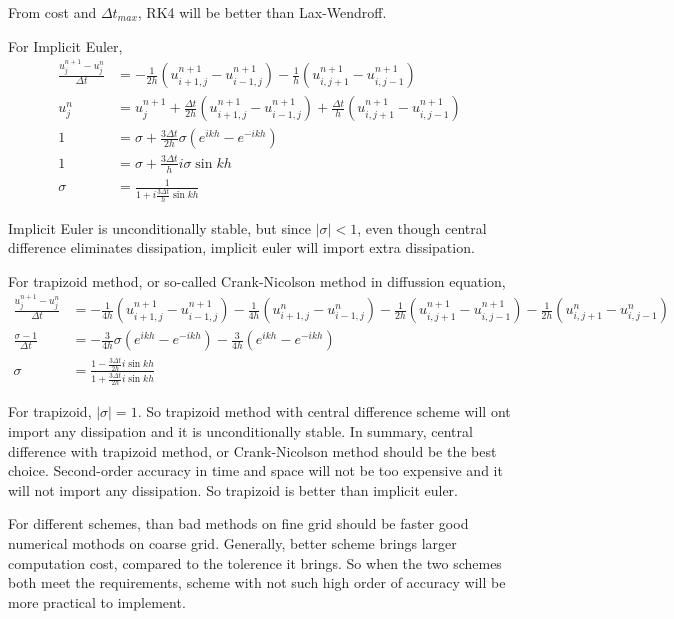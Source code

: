 \documentclass[letterpaper,10pt]{article}
\begin{document}
From cost and $\Delta t_{max}$, RK4 will be better than Lax-Wendroff. 

For Implicit Euler, 
\begin{align*}
  \frac{u_j^{n+1}-u_j^n}{\Delta t}&=-\frac{1}{2h}\left(u^{n+1}_{i+1,j}-u^{n+1}_{i-1,j}\right)-\frac{1}{h}\left(u^{n+1}_{i,j+1}-u^{n+1}_{i,j-1}\right)\\
  u_j^n&=u_j^{n+1}+\frac{\Delta t}{2h}\left(u^{n+1}_{i+1,j}-u^{n+1}_{i-1,j}\right)+\frac{\Delta t}{h}\left(u^{n+1}_{i,j+1}-u^{n+1}_{i,j-1}\right)\\
  1&=\sigma+\frac{3\Delta t}{2h}\sigma\left(e^{ikh}-e^{-ikh}\right)\\
  1&=\sigma+\frac{3\Delta t}{h}i\sigma\sin kh\\
  \sigma&=\frac{1}{1+i\frac{3\Delta t}{h}\sin kh}
\end{align*}

Implicit Euler is unconditionally stable, but since $|\sigma|<1$, even though central difference eliminates dissipation, implicit euler will import 
extra dissipation. 

For trapizoid method, or so-called Crank-Nicolson method in diffussion equation, 
\begin{align*}
  \frac{u_j^{n+1}-u_j^n}{\Delta t}&=-\frac{1}{4h}\left(u^{n+1}_{i+1,j}-u^{n+1}_{i-1,j}\right)-\frac{1}{4h}\left(u^{n}_{i+1,j}-u^{n}_{i-1,j}\right)
  -\frac{1}{2h}\left(u^{n+1}_{i,j+1}-u^{n+1}_{i,j-1}\right)-\frac{1}{2h}\left(u^{n}_{i,j+1}-u^{n}_{i,j-1}\right)\\
  \frac{\sigma-1}{\Delta t}&=-\frac{3}{4h}\sigma\left(e^{ikh}-e^{-ikh}\right)-\frac{3}{4h}\left(e^{ikh}-e^{-ikh}\right)\\
  \sigma &= \frac{1-\frac{3\Delta t}{2h}i\sin kh}{1+\frac{3\Delta t}{2h}i\sin kh}
\end{align*}

For trapizoid, $|\sigma|=1$. So trapizoid method with central difference scheme will ont import any dissipation and it is unconditionally stable. 
In summary, central difference with trapizoid method, or Crank-Nicolson method should be the best choice. Second-order accuracy in time and space will 
not be too expensive and it will not import any dissipation. So trapizoid is better than implicit euler. 

For different schemes, than bad methods on fine grid should be faster good numerical mothods on coarse grid. Generally, better scheme brings larger 
computation cost, compared to the tolerence it brings. So when the two schemes both meet the requirements, scheme with not such high order of accuracy 
will be more practical to implement. 
\end{document}
